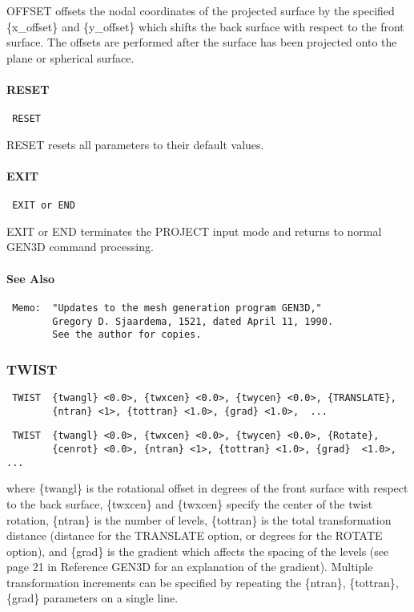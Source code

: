 OFFSET offsets the nodal coordinates of the projected surface by the
specified \{x\_offset\} and \{y\_offset\} which shifts the back surface with
respect to the front surface.  The offsets are performed after the
surface has been projected onto the plane or spherical surface.
\paragraph{RESET}
\begin{verbatim}
 RESET
\end{verbatim}

RESET resets all parameters to their default values.
\paragraph{EXIT}
\begin{verbatim}
 EXIT or END
\end{verbatim}

EXIT or END terminates the PROJECT input mode and returns to normal GEN3D
command processing.
\paragraph{See Also}
\begin{verbatim}
 Memo:  "Updates to the mesh generation program GEN3D,"
        Gregory D. Sjaardema, 1521, dated April 11, 1990.
        See the author for copies.
\end{verbatim}
\subsubsection{TWIST}
\begin{verbatim}
 TWIST  {twangl} <0.0>, {twxcen} <0.0>, {twycen} <0.0>, {TRANSLATE},
        {ntran} <1>, {tottran} <1.0>, {grad} <1.0>,  ...      
\end{verbatim}

\begin{verbatim}
 TWIST  {twangl} <0.0>, {twxcen} <0.0>, {twycen} <0.0>, {Rotate}, 
        {cenrot} <0.0>, {ntran} <1>, {tottran} <1.0>, {grad}  <1.0>,  ...     
\end{verbatim}

where \{twangl\} is the rotational offset in degrees of the front surface
with respect to the back surface, \{twxcen\} and \{twxcen\} specify the
center of the twist rotation, \{ntran\} is the number of levels, \{tottran\}
is the total transformation distance (distance for the TRANSLATE option,
or degrees for the ROTATE option), and \{grad\} is the gradient which
affects the spacing of the levels (see page 21 in Reference GEN3D
for an explanation of the gradient).  Multiple transformation increments
can be specified by repeating the \{ntran\}, \{tottran\}, \{grad\} parameters
on a single line.

